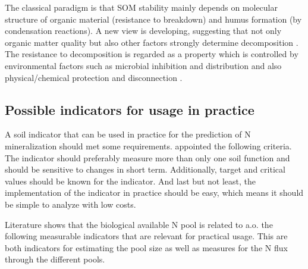 \documentclass[10pt,twoside,dutch,english]{report}
\begin{document}
The classical paradigm is that SOM stability mainly depends on molecular structure of organic material (resistance to breakdown) and humus formation (by condensation reactions). A new view is developing, suggesting that not only organic matter quality but also other factors strongly determine decomposition \citep{bingham2015}. The resistance to decomposition is regarded as a property which is controlled by environmental factors such as microbial inhibition and distribution and also physical/chemical protection and disconnection \citep{Lutzow2006,Schmidt2011}.


\subsection{Possible indicators for usage in practice}
A soil indicator that can be used in practice for the prediction of N mineralization should met some requirements. \citet{Gil-Sotres2005} appointed the following criteria. The indicator should preferably measure more than only one soil function and should be sensitive to changes in short term. Additionally, target and critical values should be known for the indicator. And last but not least, the implementation of the indicator in practice should be easy, which means it should be simple to analyze with low costs. 

Literature shows that the biological available N pool is related to a.o. the following  measurable indicators that are relevant for practical usage. This are both indicators for estimating the pool size as well as measures for the N flux through the different pools.
\end{document}
